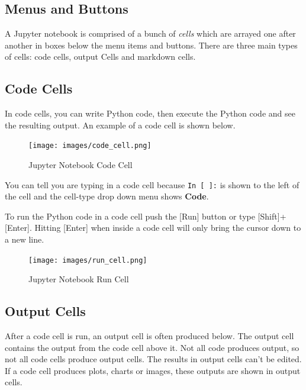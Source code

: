 \documentclass{book}
\begin{document}
    
        \subsection{Menus and Buttons}\label{menus-and-buttons}

A Jupyter notebook is comprised of a bunch of \emph{cells} which are
arrayed one after another in boxes below the menu items and buttons.
There are three main types of cells: code cells, output Cells and
markdown cells.
    




    
        \subsection{Code Cells}\label{code-cells}

In code cells, you can write Python code, then execute the Python code
and see the resulting output. An example of a code cell is shown below.

\begin{figure}
\centering
\texttt{[image: images/code\_cell.png]}
\caption{Jupyter Notebook Code Cell}
\end{figure}

You can tell you are typing in a code cell because \lstinline!In [ ]:!
is shown to the left of the cell and the cell-type drop down menu shows
\textbf{Code}.

To run the Python code in a code cell push the {[}Run{]} button or type
{[}Shift{]}+{[}Enter{]}. Hitting {[}Enter{]} when inside a code cell
will only bring the cursor down to a new line.

\begin{figure}
\centering
\texttt{[image: images/run\_cell.png]}
\caption{Jupyter Notebook Run Cell}
\end{figure}
    




    
        \subsection{Output Cells}\label{output-cells}

After a code cell is run, an output cell is often produced below. The
output cell contains the output from the code cell above it. Not all
code produces output, so not all code cells produce output cells. The
results in output cells can't be edited. If a code cell produces plots,
charts or images, these outputs are shown in output cells.
\end{document}
